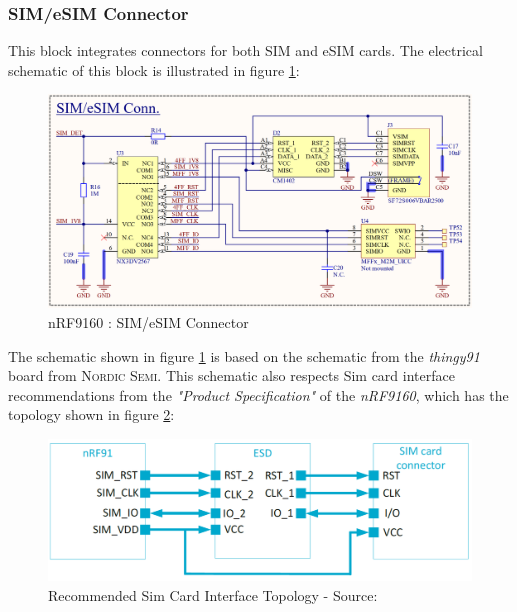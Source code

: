 \documentclass[report.tex]{subfiles}
\begin{document}
\pagebreak
\subsubsection{SIM/eSIM Connector}

This block integrates connectors for both SIM and eSIM cards. The electrical schematic of this block is illustrated in figure \ref{fig:LTEWatch_nRF9160_SIM_eSIM}:

\begin{figure}[H]
	\centering
	\includegraphics[width=1\textwidth]{Include/Figure/Hardware/LTEWatch_nRF9160_SIM_eSIM}
	\caption{nRF9160 : SIM/eSIM Connector}
	\label{fig:LTEWatch_nRF9160_SIM_eSIM}
\end{figure}

The schematic shown in figure \ref{fig:LTEWatch_nRF9160_SIM_eSIM} is based on the schematic from the \textit{thingy91}\cite{thingy91} board from \textsc{Nordic Semi.} This schematic also respects Sim card interface recommendations from the \textit{"Product Specification"}\cite{nRF9160} of the \textit{nRF9160}, which has the topology shown in figure \ref{fig:nrf9160_sim_interf}:

\begin{figure}[H]
	\centering
	\includegraphics[width=1\textwidth]{Include/Figure/comp/nrf9160_sim_interf.png}
	\caption{Recommended Sim Card Interface Topology - Source:\cite{nRF9160}}
	\label{fig:nrf9160_sim_interf}
\end{figure}
\end{document}
